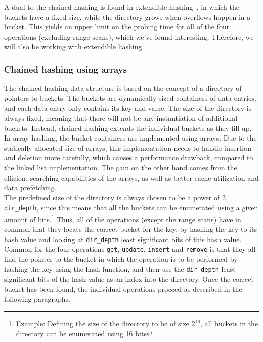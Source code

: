\documentclass[11pt]{article} %
\begin{document}
A dual to the chained hashing is found in extendible hashing~\cite{dms03}, in which the buckets have a fixed size, while the directory grows when overflows happen in a bucket. This yields an upper limit on the probing time for all of the four operations (excluding range scans), which we've found interesting. Therefore, we will also be working with extendible hashing.
\\

\subsubsection{Chained hashing using arrays}
\label{subsubsec:background_chained_hashing_using_arrays}
The chained hashing data structure is based on the concept of a directory of pointers to buckets. The buckets are dynamically sized containers of data entries, and each data entry only contains its key and value.
The size of the directory is always fixed, meaning that there will not be any instantiation of additional buckets. Instead, chained hashing extends the individual buckets as they fill up. \\

In array hashing, the bucket containers are implemented using arrays. Due to the statically allocated size of arrays, this implementation needs to handle insertion and deletion more carefully, which causes a performance drawback, compared to the linked list implementation. The gain on the other hand comes from the efficient searching capabilities of the arrays, as well as better cache utilization and data prefetching.\\

The predefined size of the directory is always chosen to be a power of 2, \verb|dir_depth|, since this means that all the buckets can be enumerated using a given amount of bits.\footnote{Example: Defining the size of the directory to be of size $2^{16}$, all buckets in the directory can be enumerated using 16 bits} Thus, all of the operations (except the range scans) have in common that they locate the correct bucket for the key, by hashing the key to its hash value and looking at \verb|dir_depth| least significant bits of this hash value. \\

Common for the four operations \verb|get|, \verb|update|, \verb|insert| and \verb|remove| is that they all find the pointer to the bucket in which the operation is to be performed by hashing the key using the hash function, and then use the \verb|dir_depth| least significant bits of the hash value as an index into the directory. Once the correct bucket has been found, the individual operations proceed as described in the following paragraphs.
\end{document}
